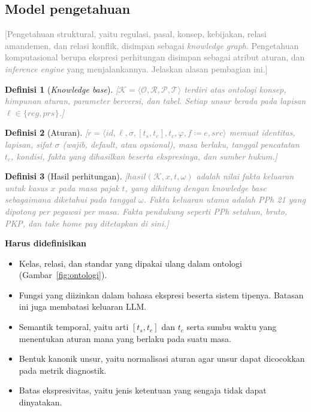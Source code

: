 \documentclass[journal,a4paper]{IEEEtran}
\newcommand{\en}[1]{\textit{#1}}
\newtheorem{definisi}{Definisi}
\newcommand{\K}{\mathcal{K}}
\newcommand{\hasil}{\mathit{hasil}}
\newif\ifrancangan \rancangantrue
\newcommand{\kotak}[3]{\ifrancangan\par\begingroup\scriptsize
  \def\FrameCommand{\fboxsep=3pt\fboxrule=0.4pt\fcolorbox{#1!60!black}{#1!6}}%
  \MakeFramed{\advance\hsize-\width\FrameRestore}\noindent\textbf{#2}\par #3\endMakeFramed\endgroup\fi}
\newcommand{\definisikan}[1]{\kotak{teal}{Harus didefinisikan}{#1}}
\newcommand{\isian}[1]{\ifrancangan\textcolor{gray}{[#1]}\fi}
\begin{document}
\subsection{Model pengetahuan}
\isian{Pengetahuan struktural, yaitu regulasi, pasal, konsep, kebijakan, relasi amandemen, dan relasi konflik, disimpan sebagai \en{knowledge graph}. Pengetahuan komputasional berupa ekspresi perhitungan disimpan sebagai atribut aturan, dan \en{inference engine} yang menjalankannya. Jelaskan alasan pembagian ini.}

\begin{definisi}[\en{Knowledge base}]
\label{def:kb}
\isian{$\K = \langle \mathcal{O}, \mathcal{R}, \mathcal{P}, \mathcal{T} \rangle$ terdiri atas ontologi konsep, himpunan aturan, parameter berversi, dan tabel. Setiap unsur berada pada lapisan $\ell \in \{\mathit{reg}, \mathit{prs}\}$.}
\end{definisi}

\begin{definisi}[Aturan]
\label{def:aturan}
\isian{$r = \langle \mathit{id}, \ell, \sigma, [t_s, t_e], t_c, \varphi, f \coloneqq e, \mathit{src} \rangle$ memuat identitas, lapisan, sifat $\sigma$ (wajib, \en{default}, atau opsional), masa berlaku, tanggal pencatatan $t_c$, kondisi, fakta yang dihasilkan beserta ekspresinya, dan sumber hukum.}
\end{definisi}

\begin{definisi}[Hasil perhitungan]
\label{def:hasil}
\isian{$\hasil(\K, x, t, \omega)$ adalah nilai fakta keluaran untuk kasus $x$ pada masa pajak $t$, yang dihitung dengan \en{knowledge base} sebagaimana diketahui pada tanggal $\omega$. Fakta keluaran utama adalah PPh 21 yang dipotong per pegawai per masa. Fakta pendukung seperti PPh setahun, bruto, PKP, dan \en{take home pay} ditetapkan di sini.}
\end{definisi}

\definisikan{
\begin{itemize}[leftmargin=*,nosep]
  \item Kelas, relasi, dan standar yang dipakai ulang dalam ontologi (Gambar~\ref{fig:ontologi}).
  \item Fungsi yang diizinkan dalam bahasa ekspresi beserta sistem tipenya. Batasan ini juga membatasi keluaran LLM.
  \item Semantik temporal, yaitu arti $[t_s, t_e]$ dan $t_c$ serta sumbu waktu yang menentukan aturan mana yang berlaku pada suatu masa.
  \item Bentuk kanonik unsur, yaitu normalisasi aturan agar unsur dapat dicocokkan pada metrik diagnostik.
  \item Batas ekspresivitas, yaitu jenis ketentuan yang sengaja tidak dapat dinyatakan.
\end{itemize}
}
\end{document}
